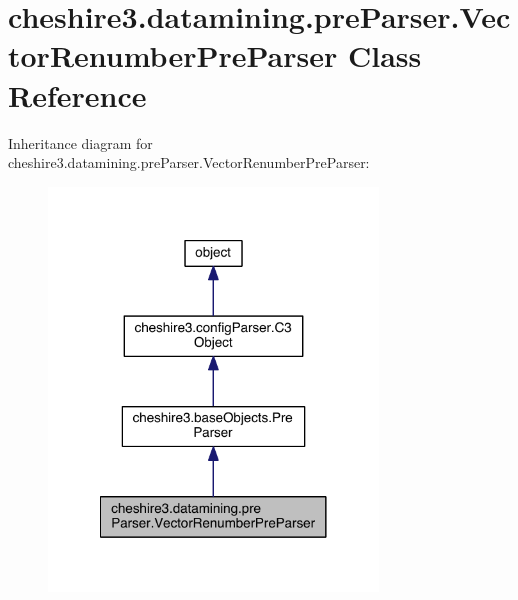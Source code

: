 \hypertarget{classcheshire3_1_1datamining_1_1pre_parser_1_1_vector_renumber_pre_parser}{\section{cheshire3.\-datamining.\-pre\-Parser.\-Vector\-Renumber\-Pre\-Parser Class Reference}
\label{classcheshire3_1_1datamining_1_1pre_parser_1_1_vector_renumber_pre_parser}
}


Inheritance diagram for cheshire3.\-datamining.\-pre\-Parser.\-Vector\-Renumber\-Pre\-Parser\-:
\nopagebreak
\begin{figure}[H]
\begin{center}
\leavevmode
\includegraphics[width=248pt]{classcheshire3_1_1datamining_1_1pre_parser_1_1_vector_renumber_pre_parser__inherit__graph}
\end{center}
\end{figure}


